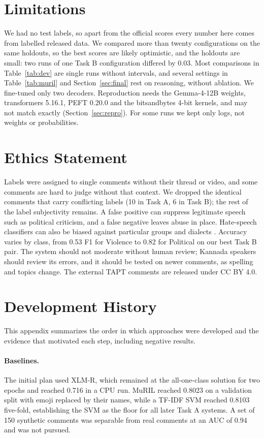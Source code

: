\documentclass[11pt]{article}
\newcommand{\taska}{Task A}
\newcommand{\taskb}{Task B}
\begin{document}
\section*{Limitations}
We had no test labels, so apart from the official scores every number here comes
from labelled released data. We compared more than twenty configurations on the
same holdouts, so the best scores are likely optimistic, and the holdouts are
small: two runs of one \taskb{} configuration differed by 0.03. Most comparisons in
Table~\ref{tab:dev} are single runs without intervals, and several settings in
Table~\ref{tab:muril} and Section~\ref{sec:final} rest on reasoning, without
ablation. We fine-tuned only two decoders. Reproduction needs the Gemma-4-12B
weights, transformers 5.16.1, PEFT 0.20.0 and the bitsandbytes 4-bit kernels, and
may not match exactly (Section~\ref{sec:repro}). For some runs we kept only logs,
not weights or probabilities.

\section*{Ethics Statement}
Labels were assigned to single comments without their thread or video, and some
comments are hard to judge without that context. We dropped the identical
comments that carry conflicting labels (10 in \taska{}, 6 in \taskb{}); the rest
of the label subjectivity remains. A false positive can suppress legitimate
speech such as political criticism, and a false negative leaves abuse in place.
Hate-speech classifiers can also be biased against particular groups and
dialects \citep{sap-etal-2019-risk}.
Accuracy varies by class, from 0.53 F1 for Violence to 0.82 for Political on our
best \taskb{} pair. The system should not moderate without human review; Kannada
speakers should review its errors, and it should be tested on newer comments, as
spelling and topics change. The external TAPT comments are released under CC BY
4.0.




\appendix

\section{Development History}
\label{app:timeline}
This appendix summarizes the order in which approaches were developed and the
evidence that motivated each step, including negative results.

\paragraph{Baselines.} The initial plan used XLM-R, which remained at the
all-one-class solution for two epochs and reached 0.716 in a CPU run. MuRIL
reached 0.8023 on a validation split with emoji replaced by their names, while a
TF-IDF SVM reached 0.8103 five-fold, establishing the SVM as the floor for all
later \taska{} systems. A set of 150 synthetic comments was separable from real
comments at an AUC of 0.94 and was not pursued.
\end{document}
